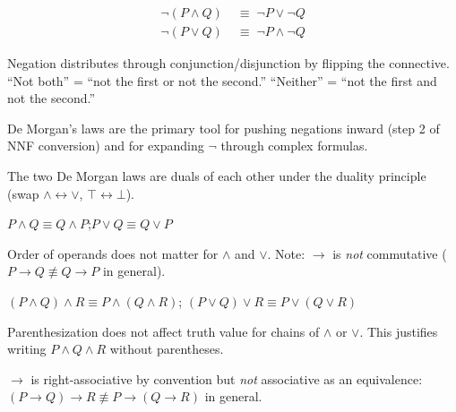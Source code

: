 \begin{proposition}\label{eq:demorgan}
\begin{align*}
\neg(P \wedge Q) &\;\equiv\; \neg P \vee \neg Q \\
\neg(P \vee Q)   &\;\equiv\; \neg P \wedge \neg Q
\end{align*}
\end{proposition}
\begin{remark}[Intuition] Negation distributes through conjunction/disjunction
by flipping the connective. ``Not both'' = ``not the first or not the second.''
``Neither'' = ``not the first and not the second.''
\end{remark}
\begin{remark}[Consequence] De Morgan's laws are the primary tool for pushing
negations inward (step 2 of NNF conversion) and for expanding $\neg$ through
complex formulas.
\end{remark}
\begin{remark}
The two De Morgan laws are duals of each other under the duality principle
(swap $\wedge\leftrightarrow\vee$, $\top\leftrightarrow\bot$).
\end{remark}

\begin{proposition}[Commutativity]\label{eq:comm}
$P \wedge Q \equiv Q \wedge P$;\qquad $P \vee Q \equiv Q \vee P$
\end{proposition}
\begin{remark}[Intuition] Order of operands does not matter for $\wedge$ and $\vee$.
Note: $\rightarrow$ is \emph{not} commutative ($P \rightarrow Q \not\equiv Q \rightarrow P$
in general).
\end{remark}

\begin{proposition}[Associativity]\label{eq:assoc}
$(P \wedge Q) \wedge R \equiv P \wedge (Q \wedge R)$;\qquad
$(P \vee Q) \vee R \equiv P \vee (Q \vee R)$
\end{proposition}
\begin{remark}[Intuition] Parenthesization does not affect truth value for chains
of $\wedge$ or $\vee$. This justifies writing $P \wedge Q \wedge R$ without
parentheses.
\end{remark}
\begin{remark} $\rightarrow$ is right-associative by convention
but \emph{not} associative as an equivalence: $(P \rightarrow Q) \rightarrow R
\not\equiv P \rightarrow (Q \rightarrow R)$ in general.
\end{remark}

